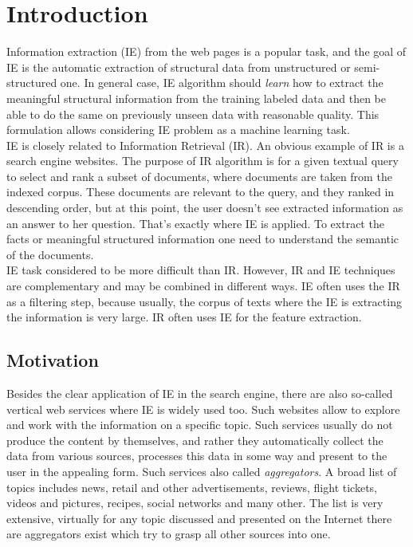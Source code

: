 \chapter{Introduction}
\label{chap:intro}
Information extraction (IE) from the web pages is a popular task, and the goal of IE is the automatic extraction of structural data from unstructured or semi-structured one. In general case, IE algorithm should \textit{learn} how to extract the meaningful structural information from the training labeled data and then be able to do the same on previously unseen data with reasonable quality. This formulation allows considering IE problem as a machine learning task.\\

IE is closely related to Information Retrieval (IR). An obvious example of IR is a search engine websites. The purpose of IR algorithm is for a given textual query to select and rank a subset of documents, where documents are taken from the indexed corpus. These documents are relevant to the query, and they ranked in descending order, but at this point, the user doesn't see extracted information as an answer to her question. That's exactly where IE is applied. To extract the facts or meaningful structured information one need to understand the semantic of the documents.\\

IE task considered to be more difficult than IR. However, IR and IE techniques are complementary and may be combined in different ways. IE often uses the IR as a filtering step, because usually, the corpus of texts where the IE is extracting the information is very large. IR often uses IE for the feature extraction.\\
\cite{IEstate}

\section{Motivation}
Besides the clear application of IE in the search engine, there are also so-called vertical web services where IE is widely used too. Such websites allow to explore and work with the information on a specific topic. Such services usually do not produce the content by themselves, and rather they automatically collect the data from various sources, processes this data in some way and present to the user in the appealing form. Such services also called \textit{aggregators}. A broad list of topics includes news, retail and other advertisements, reviews, flight tickets, videos and pictures, recipes, social networks and many other. The list is very extensive, virtually for any topic discussed and presented on the Internet there are aggregators exist which try to grasp all other sources into one. \\


